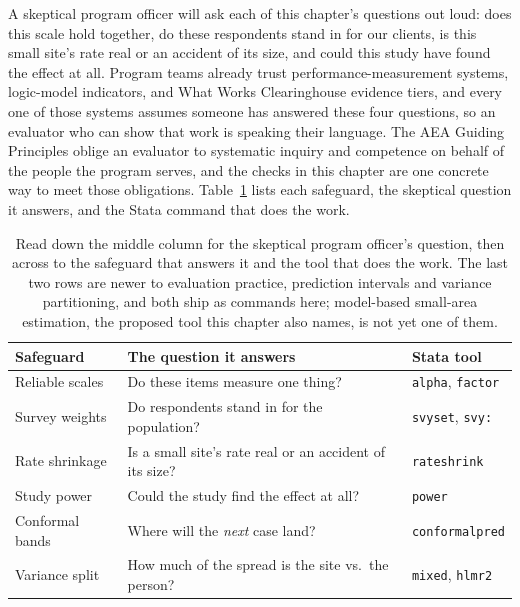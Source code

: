 \documentclass[
    a4paper,
    fontsize=10pt,
    twoside=true,
    numbers=noenddot,
]{kaobook}
\begin{document}
A skeptical program officer will ask each of this chapter's questions out loud: does this scale hold together, do these respondents stand in for our clients, is this small site's rate real or an accident of its size, and could this study have found the effect at all. Program teams already trust performance-measurement systems, logic-model indicators, and What Works Clearinghouse evidence tiers, and every one of those systems assumes someone has answered these four questions, so an evaluator who can show that work is speaking their language. The AEA Guiding Principles oblige an evaluator to systematic inquiry and competence on behalf of the people the program serves, and the checks in this chapter are one concrete way to meet those obligations. Table~\ref{tab:ch07-viz-map} lists each safeguard, the skeptical question it answers, and the Stata command that does the work.

\begin{table}[htbp]
\centering
\caption[The chapter's safeguards and the question each answers]{Read down the middle column for the skeptical program officer's question, then across to the safeguard that answers it and the tool that does the work. The last two rows are newer to evaluation practice, prediction intervals and variance partitioning, and both ship as commands here; model-based small-area estimation, the proposed tool this chapter also names, is not yet one of them.}
\label{tab:ch07-viz-map}
{\footnotesize
\begin{tabular}{p{2.3cm}p{4.7cm}p{2.4cm}}
\hline
Safeguard & The question it answers & Stata tool \\
\hline
Reliable scales & Do these items measure one thing? & \texttt{alpha}, \texttt{factor} \\
Survey weights & Do respondents stand in for the population? & \texttt{svyset}, \texttt{svy:} \\
Rate shrinkage & Is a small site's rate real or an accident of its size? & \texttt{rateshrink} \\
Study power & Could the study find the effect at all? & \texttt{power} \\
Conformal bands & Where will the \emph{next} case land? & \texttt{conformalpred} \\
Variance split & How much of the spread is the site vs.\ the person? & \texttt{mixed}, \texttt{hlmr2} \\
\hline
\end{tabular}
}
\end{table}
\end{document}
